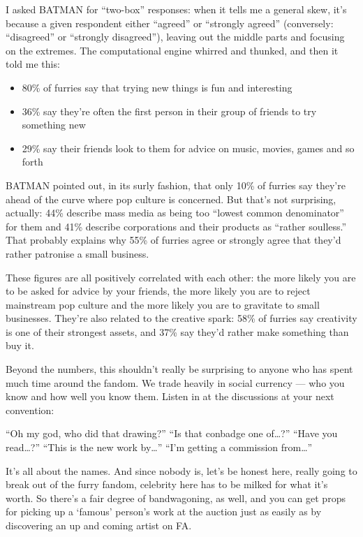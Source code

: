 I asked BATMAN for ``two-box'' responses: when it tells me a general skew, it's because a given respondent either ``agreed'' or ``strongly agreed'' (conversely: ``disagreed'' or ``strongly disagreed''), leaving out the middle parts and focusing on the extremes. The computational engine whirred and thunked, and then it told me this:

\begin{itemize}
  \item 80\% of furries say that trying new things is fun and interesting
  \item 36\% say they're often the first person in their group of friends to try something new
  \item 29\% say their friends look to them for advice on music, movies, games and so forth
\end{itemize}

BATMAN pointed out, in its surly fashion, that only 10\% of furries say they're ahead of the curve where pop culture is concerned. But that's not surprising, actually: 44\% describe mass media as being too ``lowest common denominator'' for them and 41\% describe corporations and their products as ``rather soulless.'' That probably explains why 55\% of furries agree or strongly agree that they'd rather patronise a small business.

These figures are all positively correlated with each other: the more likely you are to be asked for advice by your friends, the more likely you are to reject mainstream pop culture and the more likely you are to gravitate to small businesses. They're also related to the creative spark: 58\% of furries say creativity is one of their strongest assets, and 37\% say they'd rather make something than buy it.

Beyond the numbers, this shouldn't really be surprising to anyone who has spent much time around the fandom. We trade heavily in social currency — who you know and how well you know them. Listen in at the discussions at your next convention:

``Oh my god, who did that drawing?''
``Is that conbadge one of\ldots?''
``Have you read\ldots?''
``This is the new work by\ldots''
``I'm getting a commission from\ldots''

It's all about the names. And since nobody is, let's be honest here, really going to break out of the furry fandom, celebrity here has to be milked for what it's worth. So there's a fair degree of bandwagoning, as well, and you can get props for picking up a ‘famous' person's work at the auction just as easily as by discovering an up and coming artist on FA.

